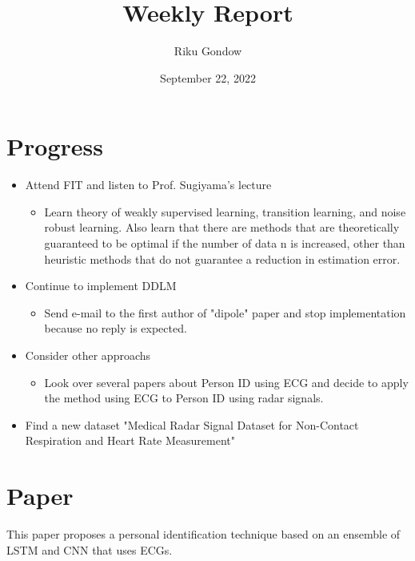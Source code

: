 \documentclass[dvipdfmx]{article}
\begin{document}
\title{Weekly Report}
\author{Riku Gondow}
\date{September 22, 2022}
\maketitle
\section{Progress}
\begin{itemize}
    \item Attend FIT and listen to Prof. Sugiyama's lecture
    \begin{itemize}
        \item Learn theory of weakly supervised learning, transition learning, and noise robust learning. Also learn that there are methods that are theoretically guaranteed to be optimal if the number of data n is increased, other than heuristic methods that do not guarantee a reduction in estimation error.
    \end{itemize}

    \item Continue to implement DDLM\cite{ddlm}
    \begin{itemize}
        \item Send e-mail to the first author of "dipole" paper
        and stop implementation because no reply is expected.
    \end{itemize}

    \item Consider other approachs
    \begin{itemize}
        \item Look over several papers about Person ID using ECG
        and decide to apply the method using ECG to Person ID using radar signals.
    \end{itemize}

    \item Find a new dataset "Medical Radar Signal Dataset for Non-Contact Respiration and Heart Rate Measurement"\cite{dataset}
\end{itemize}

\section{Paper\cite{ensemble}}
This paper proposes a personal identification technique based on an ensemble of LSTM and CNN that uses ECGs. 
\end{document}
